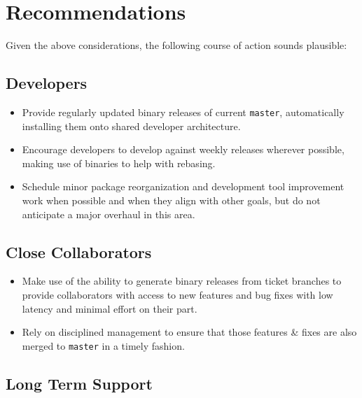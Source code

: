 \documentclass[DM,toc]{lsstdoc}
\begin{document}
\section{Recommendations}
\label{sec:recommendations}

Given the above considerations, the following course of action sounds
plausible:

\subsection{Developers}

\begin{itemize}

  \item{Provide regularly updated binary releases of current \texttt{master},
  automatically installing them onto shared developer architecture.}

  \item{Encourage developers to develop against weekly releases wherever
  possible, making use of binaries to help with rebasing.}

  \item{Schedule minor package reorganization and development tool improvement
  work when possible and when they align with other goals, but do not
  anticipate a major overhaul in this area.}

\end{itemize}

\subsection{Close Collaborators}

\begin{itemize}

  \item{Make use of the ability to generate binary releases from ticket
  branches to provide collaborators with access to new features and bug fixes
  with low latency and minimal effort on their part.}

  \item{Rely on disciplined management to ensure that those features \& fixes
  are also merged to \texttt{master} in a timely fashion.}

\end{itemize}

\subsection{Long Term Support}
\end{document}
